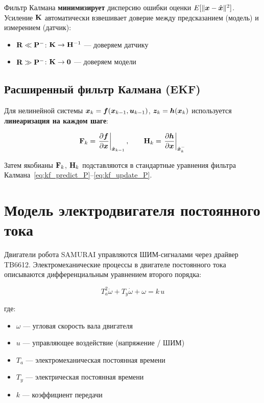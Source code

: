 \begin{formulabox}
Фильтр Калмана \textbf{минимизирует} дисперсию ошибки оценки
$E[\|\bm{x} - \hat{\bm{x}}\|^2]$. Усиление $\mathbf{K}$ автоматически
взвешивает доверие между предсказанием (модель) и измерением (датчик):
\begin{itemize}
  \item $\mathbf{R} \ll \mathbf{P}^-$: $\mathbf{K} \to \mathbf{H}^{-1}$ --- доверяем датчику
  \item $\mathbf{R} \gg \mathbf{P}^-$: $\mathbf{K} \to \mathbf{0}$ --- доверяем модели
\end{itemize}
\end{formulabox}

\subsection{Расширенный фильтр Калмана (EKF)}

Для нелинейной системы $\bm{x}_k = \bm{f}(\bm{x}_{k-1}, \bm{u}_{k-1})$,
$\bm{z}_k = \bm{h}(\bm{x}_k)$ используется \textbf{линеаризация
на каждом шаге}:

\begin{equation}
  \mathbf{F}_k = \left.\frac{\partial \bm{f}}{\partial \bm{x}}\right|_{\hat{\bm{x}}_{k-1}}, \qquad
  \mathbf{H}_k = \left.\frac{\partial \bm{h}}{\partial \bm{x}}\right|_{\hat{\bm{x}}_k^-}
  \label{eq:ekf_linearize}
\end{equation}

Затем якобианы $\mathbf{F}_k$, $\mathbf{H}_k$ подставляются в стандартные
уравнения фильтра Калмана~\eqref{eq:kf_predict_P}--\eqref{eq:kf_update_P}.

\section{Модель электродвигателя постоянного тока}
\label{sec:dc_motor}

Двигатели робота SAMURAI управляются ШИМ-сигналами через драйвер TB6612.
Электромеханические процессы в двигателе постоянного тока описываются
дифференциальным уравнением второго порядка:

\begin{equation}
  \boxed{T_a^2\ddot{\omega} + T_y\dot{\omega} + \omega = k\,u}
  \label{eq:dc_motor}
\end{equation}

где:
\begin{itemize}
  \item $\omega$ --- угловая скорость вала двигателя
  \item $u$ --- управляющее воздействие (напряжение / ШИМ)
  \item $T_a$ --- электромеханическая постоянная времени
  \item $T_y$ --- электрическая постоянная времени
  \item $k$ --- коэффициент передачи
\end{itemize}

